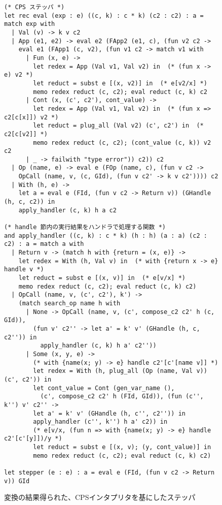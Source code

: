 \begin{figure}
\begin{spacing}{0.9}
\begin{verbatim}
(* CPS ステッパ *)
let rec eval (exp : e) ((c, k) : c * k) (c2 : c2) : a = match exp with
  | Val (v) -> k v c2
  | App (e1, e2) -> eval e2 (FApp2 (e1, c), (fun v2 c2 ->
    eval e1 (FApp1 (c, v2), (fun v1 c2 -> match v1 with
      | Fun (x, e) ->
        let redex = App (Val v1, Val v2) in  (* (fun x -> e) v2 *)
        let reduct = subst e [(x, v2)] in  (* e[v2/x] *)
        memo redex reduct (c, c2); eval reduct (c, k) c2
      | Cont (x, (c', c2'), cont_value) ->
        let redex = App (Val v1, Val v2) in  (* (fun x => c2[c[x]]) v2 *)
        let reduct = plug_all (Val v2) (c', c2') in  (* c2[c[v2]] *)
        memo redex reduct (c, c2); (cont_value (c, k)) v2 c2
      | _ -> failwith "type error")) c2)) c2
  | Op (name, e) -> eval e (FOp (name, c), (fun v c2 ->
    OpCall (name, v, (c, GId), (fun v c2' -> k v c2')))) c2
  | With (h, e) ->
    let a = eval e (FId, (fun v c2 -> Return v)) (GHandle (h, c, c2)) in
    apply_handler (c, k) h a c2

(* handle 節内の実行結果をハンドラで処理する関数 *)
and apply_handler ((c, k) : c * k) (h : h) (a : a) (c2 : c2) : a = match a with
  | Return v -> (match h with {return = (x, e)} ->
    let redex = With (h, Val v) in  (* with {return x -> e} handle v *)
    let reduct = subst e [(x, v)] in  (* e[v/x] *)
    memo redex reduct (c, c2); eval reduct (c, k) c2)
  | OpCall (name, v, (c', c2'), k') ->
    (match search_op name h with
      | None -> OpCall (name, v, (c', compose_c2 c2' h (c, GId)),
        (fun v' c2'' -> let a' = k' v' (GHandle (h, c, c2'')) in
          apply_handler (c, k) h a' c2''))
      | Some (x, y, e) ->
        (* with {name(x; y) -> e} handle c2'[c'[name v]] *)
        let redex = With (h, plug_all (Op (name, Val v)) (c', c2')) in
        let cont_value = Cont (gen_var_name (),
          (c', compose_c2 c2' h (FId, GId)), (fun (c'', k'') v' c2'' ->
        let a' = k' v' (GHandle (h, c'', c2'')) in
        apply_handler (c'', k'') h a' c2)) in
        (* e[v/x, (fun n => with {name(x; y) -> e} handle c2'[c'[y]])/y *)
        let reduct = subst e [(x, v); (y, cont_value)] in
        memo redex reduct (c, c2); eval reduct (c, k) c2)

let stepper (e : e) : a = eval e (FId, (fun v c2 -> Return v)) GId
\end{verbatim}
\caption{変換の結果得られた、CPSインタプリタを基にしたステッパ}
\label{figure:6cps}
\end{spacing}
\end{figure}

